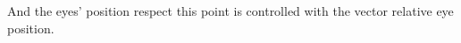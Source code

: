 \documentclass[preview]{standalone}
\begin{document}
\begin{center}
And the eyes' position respect this point is controlled with the vector relative eye position.
\end{center}
\end{document}
